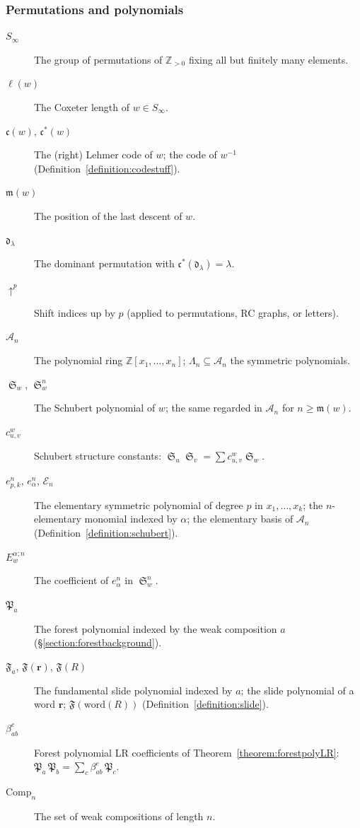 \documentclass{amsart}
\theoremstyle{definition}
\theoremstyle{remark}
\numberwithin{equation}{subsection}
\DeclareMathOperator{\sch}{\mathfrak{S}}
\newcommand{\shup}{{\uparrow}}
\newcommand{\coma}{\mathcal{A}}
\newcommand{\dom}{\mathfrak{d}}
\newcommand{\code}{\mathfrak{c}}
\newcommand{\forest}{\mathfrak{P}}
\newcommand{\maxd}{\mathfrak{m}}
\begin{document}
\subsubsection*{Permutations and polynomials}
\begin{description}
\item[$S_\infty$] The group of permutations of $\mathbb{Z}_{>0}$ fixing all but finitely many elements.
\item[$\ell(w)$] The Coxeter length of $w\in S_\infty$.
\item[$\code(w)$, $\code^*(w)$] The (right) Lehmer code of $w$; the code of $w^{-1}$ (Definition~\ref{definition:codestuff}).
\item[$\maxd(w)$] The position of the last descent of $w$.
\item[$\dom_\lambda$] The dominant permutation with $\code^*(\dom_\lambda)=\lambda$.
\item[$\shup^p$] Shift indices up by $p$ (applied to permutations, RC graphs, or letters).
\item[$\coma_n$] The polynomial ring $\mathbb{Z}[x_1,\ldots,x_n]$; $\Lambda_n\subseteq\coma_n$ the symmetric polynomials.
\item[$\sch_w$, $\sch_w^n$] The Schubert polynomial of $w$; the same regarded in $\coma_n$ for $n\geq\maxd(w)$.
\item[$c_{u,v}^w$] Schubert structure constants: $\sch_u\sch_v=\sum c_{u,v}^w\sch_w$.
\item[$e_{p,k}^n$, $e_\alpha^n$, $\mathcal{E}_n$] The elementary symmetric polynomial of degree $p$ in $x_1,\ldots,x_k$; the $n$-elementary monomial indexed by $\alpha$; the elementary basis of $\coma_n$ (Definition~\ref{definition:schubert}).
\item[$E_w^{\alpha;n}$] The coefficient of $e_\alpha^n$ in $\sch_w^n$.
\item[$\forest_a$] The forest polynomial indexed by the weak composition $a$ (\S\ref{section:forestbackground}).
\item[$\mathfrak{F}_a$, $\mathfrak{F}(\mathbf r)$, $\mathfrak F(R)$] The fundamental slide polynomial indexed by $a$; the slide polynomial of a word $\mathbf r$; $\mathfrak F(\mathrm{word}(R))$ (Definition~\ref{definition:slide}).
\item[$\beta_{ab}^c$] Forest polynomial LR coefficients of Theorem~\ref{theorem:forestpolyLR}: $\forest_a\,\forest_b=\sum_c\beta_{ab}^c\,\forest_c$.
\item[$\mathrm{Comp}_n$] The set of weak compositions of length $n$.
\end{description}
\end{document}
